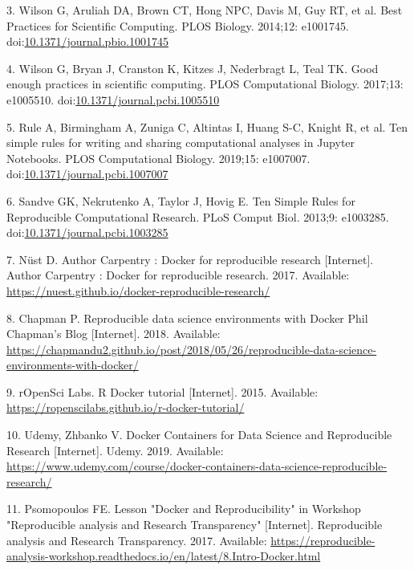 \documentclass[10pt,letterpaper]{article}
\begin{document}
\leavevmode\hypertarget{ref-wilson_best_2014}{}%
3. Wilson G, Aruliah DA, Brown CT, Hong NPC, Davis M, Guy RT, et al.
Best Practices for Scientific Computing. PLOS Biology. 2014;12:
e1001745.
doi:\href{https://doi.org/10.1371/journal.pbio.1001745}{10.1371/journal.pbio.1001745}

\leavevmode\hypertarget{ref-wilson_good_2017}{}%
4. Wilson G, Bryan J, Cranston K, Kitzes J, Nederbragt L, Teal TK. Good
enough practices in scientific computing. PLOS Computational Biology.
2017;13: e1005510.
doi:\href{https://doi.org/10.1371/journal.pcbi.1005510}{10.1371/journal.pcbi.1005510}

\leavevmode\hypertarget{ref-rule_ten_2019}{}%
5. Rule A, Birmingham A, Zuniga C, Altintas I, Huang S-C, Knight R, et
al. Ten simple rules for writing and sharing computational analyses in
Jupyter Notebooks. PLOS Computational Biology. 2019;15: e1007007.
doi:\href{https://doi.org/10.1371/journal.pcbi.1007007}{10.1371/journal.pcbi.1007007}

\leavevmode\hypertarget{ref-sandve_ten_2013}{}%
6. Sandve GK, Nekrutenko A, Taylor J, Hovig E. Ten Simple Rules for
Reproducible Computational Research. PLoS Comput Biol. 2013;9: e1003285.
doi:\href{https://doi.org/10.1371/journal.pcbi.1003285}{10.1371/journal.pcbi.1003285}

\leavevmode\hypertarget{ref-nust_author_2017}{}%
7. Nüst D. Author Carpentry : Docker for reproducible research
{[}Internet{]}. Author Carpentry : Docker for reproducible research.
2017. Available:
\url{https://nuest.github.io/docker-reproducible-research/}

\leavevmode\hypertarget{ref-chapman_reproducible_2018}{}%
8. Chapman P. Reproducible data science environments with Docker Phil
Chapman's Blog {[}Internet{]}. 2018. Available:
\url{https://chapmandu2.github.io/post/2018/05/26/reproducible-data-science-environments-with-docker/}

\leavevmode\hypertarget{ref-ropensci_labs_r_2015}{}%
9. rOpenSci Labs. R Docker tutorial {[}Internet{]}. 2015. Available:
\url{https://ropenscilabs.github.io/r-docker-tutorial/}

\leavevmode\hypertarget{ref-udemy_docker_2019}{}%
10. Udemy, Zhbanko V. Docker Containers for Data Science and
Reproducible Research {[}Internet{]}. Udemy. 2019. Available:
\url{https://www.udemy.com/course/docker-containers-data-science-reproducible-research/}

\leavevmode\hypertarget{ref-psomopoulos_lesson_2017}{}%
11. Psomopoulos FE. Lesson "Docker and Reproducibility" in Workshop
"Reproducible analysis and Research Transparency" {[}Internet{]}.
Reproducible analysis and Research Transparency. 2017. Available:
\url{https://reproducible-analysis-workshop.readthedocs.io/en/latest/8.Intro-Docker.html}
\end{document}
